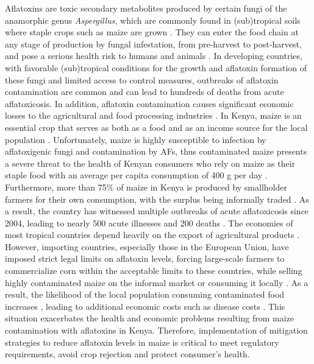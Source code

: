 \begin{refsection}
Aflatoxins are toxic secondary metabolites produced by certain fungi of the anamorphic genus \textit{Aspergillus}, which are commonly found in (sub)tropical soils where staple crops such as maize are grown \citep{mahuku2019pre}. They can enter the food chain at any stage of production by fungal infestation, from pre-harvest to post-harvest, and pose a serious health risk to humans and animals \citep{winter2019review}. In developing countries, with favorable (sub)tropical conditions for the growth and aflatoxin formation of these fungi and limited access to control measures, outbreaks of aflatoxin contamination are common and can lead to hundreds of deaths from acute aflatoxicosis. In addition, aflatoxin contamination causes significant economic losses to the agricultural and food processing industries \citep{winter2019review}. In Kenya, maize is an essential crop that serves as both as a food and as an income source for the local population \citep{mahuku2019pre}. Unfortunately, maize is highly susceptible to infection by aflatoxigenic fungi and contamination by AFs, thus contaminated maize presents a severe threat to the health of Kenyan consumers who rely on maize as their staple food with an average per capita consumption of 400 g per day \citep{lewis2005aflatoxin}. Furthermore, more than 75\% of maize in Kenya is produced by smallholder farmers for their own consumption, with the surplus being informally traded \citep{mahuku2019pre}. As a result, the country has witnessed multiple outbreaks of acute aflatoxicosis since 2004, leading to nearly 500 acute illnesses and 200 deaths \citep{lewis2005aflatoxin}. The economies of most tropical countries depend heavily on the export of agricultural products \citep{matumba2015concentrating}. However, importing countries, especially those in the European Union, have imposed strict legal limits on aflatoxin levels, forcing large-scale farmers to commercialize corn within the acceptable limits to these countries, while selling highly contaminated maize on the informal market or consuming it locally \citep{matumba2015concentrating, nji2022six}. As a result, the likelihood of the local population consuming contaminated food increases \citep{nji2022six, udomkun2017mycotoxins}, leading to additional economic costs such as disease costs \citep{meijer2021aflatoxin}. This situation exacerbates the health and economic problems resulting from maize contamination with aflatoxins in Kenya. Therefore, implementation of mitigation strategies to reduce aflatoxin levels in maize is critical to meet regulatory requirements, avoid crop rejection and protect consumer's health.



\end{refsection}
